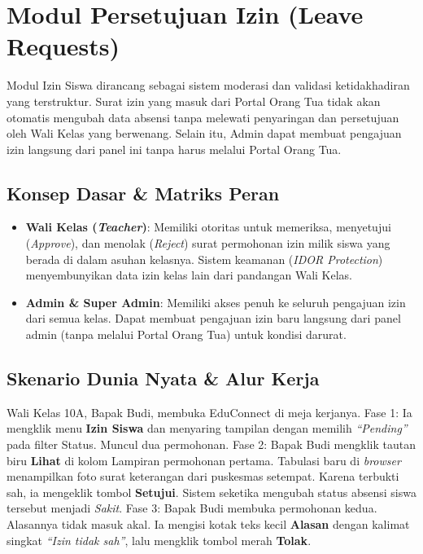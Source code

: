 \chapter{Modul Persetujuan Izin (Leave Requests)}

Modul Izin Siswa dirancang sebagai sistem moderasi dan validasi ketidakhadiran yang terstruktur. Surat izin yang masuk dari Portal Orang Tua tidak akan otomatis mengubah data absensi tanpa melewati penyaringan dan persetujuan oleh Wali Kelas yang berwenang. Selain itu, Admin dapat membuat pengajuan izin langsung dari panel ini tanpa harus melalui Portal Orang Tua.

\section{Konsep Dasar \& Matriks Peran}
\begin{itemize}
    \item \textbf{Wali Kelas (\textit{Teacher})}: Memiliki otoritas untuk memeriksa, menyetujui (\textit{Approve}), dan menolak (\textit{Reject}) surat permohonan izin milik siswa yang berada di dalam asuhan kelasnya. Sistem keamanan (\textit{IDOR Protection}) menyembunyikan data izin kelas lain dari pandangan Wali Kelas.
    \item \textbf{Admin \& Super Admin}: Memiliki akses penuh ke seluruh pengajuan izin dari semua kelas. Dapat membuat pengajuan izin baru langsung dari panel admin (tanpa melalui Portal Orang Tua) untuk kondisi darurat.
\end{itemize}

\section{Skenario Dunia Nyata \& Alur Kerja}

Wali Kelas 10A, Bapak Budi, membuka EduConnect di meja kerjanya. Fase 1: Ia mengklik menu \textbf{Izin Siswa} dan menyaring tampilan dengan memilih \textit{``Pending''} pada filter Status. Muncul dua permohonan. Fase 2: Bapak Budi mengklik tautan biru \textbf{Lihat} di kolom Lampiran permohonan pertama. Tabulasi baru di \textit{browser} menampilkan foto surat keterangan dari puskesmas setempat. Karena terbukti sah, ia mengeklik tombol \textbf{Setujui}. Sistem seketika mengubah status absensi siswa tersebut menjadi \textit{Sakit}. Fase 3: Bapak Budi membuka permohonan kedua. Alasannya tidak masuk akal. Ia mengisi kotak teks kecil \textbf{Alasan} dengan kalimat singkat \textit{``Izin tidak sah''}, lalu mengklik tombol merah \textbf{Tolak}.

